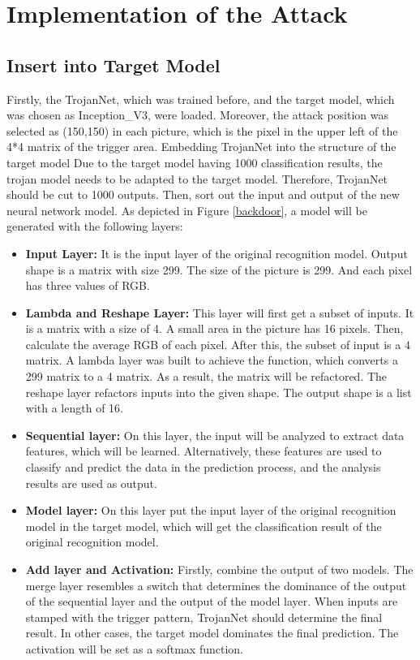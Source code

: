 \documentclass[english,version-2022-01]{uzl-thesis}
\begin{document}
\section{Implementation of the Attack}
\subsection{Insert into Target Model}\label{combine} Firstly, the TrojanNet, which was trained before, and the target model, which was chosen as Inception\_V3, were loaded. Moreover, the attack position was selected as (150,150) in each picture, which is the pixel in the upper left of the 4*4 matrix of the trigger area. Embedding TrojanNet into the structure of the target model Due to the target model having 1000 classification results, the trojan model needs to be adapted to the target model. Therefore, TrojanNet should be cut to 1000 outputs. Then, sort out the input and output of the new neural network model. As depicted in Figure \ref{backdoor}, a model will be generated with the following layers:
\begin{itemize}
    \item \textbf{Input Layer: } It is the input layer of the original recognition model. Output shape is a matrix with size 299. The size of the picture is 299. And each pixel has three values of RGB.\\
    \item \textbf{Lambda and Reshape Layer: } This layer will first get a subset of inputs. It is a matrix with a size of 4. A small area in the picture has 16 pixels. Then, calculate the average RGB of each pixel. After this, the subset of input is a 4 matrix. A lambda layer was built to achieve the function, which converts a 299 matrix to a 4 matrix.\cite{keras} As a result, the matrix will be refactored. The reshape layer refactors inputs into the given shape. The output shape is a list with a length of 16. \\
    \item \textbf{Sequential layer: } On this layer, the input will be analyzed to extract data features, which will be learned. Alternatively, these features are used to classify and predict the data in the prediction process, and the analysis results are used as output.\\
    \item \textbf{Model layer: } On this layer put the input layer of the original recognition model in the target model, which will get the classification result of the original recognition model.\\
    \item \textbf{Add layer and Activation: } Firstly, combine the output of two models. The merge layer resembles a switch that determines the dominance of the output of the sequential layer and the output of the model layer. When inputs are stamped with the trigger pattern, TrojanNet should determine the final result. In other cases, the target model dominates the final prediction. The activation will be set as a softmax function.\\
\end{itemize}
\end{document}
